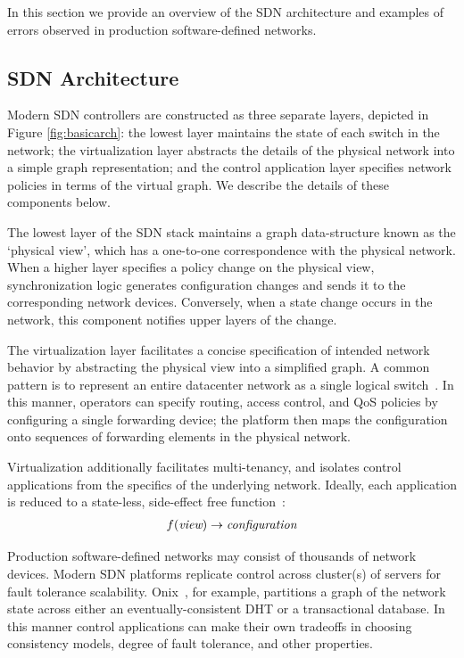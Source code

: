 In this section we provide an overview of the SDN architecture and examples 
of errors observed in production software-defined networks.

\subsection{SDN Architecture}

Modern SDN controllers are constructed as three separate layers, depicted in Figure \ref{fig:basicarch}:
the lowest layer maintains the state of each switch in the network; the virtualization layer 
abstracts the details of the physical network into a simple graph representation;
and the control application layer specifies network policies in terms of the
virtual graph. We describe the details of these components below.

The lowest layer of the SDN stack maintains a graph data-structure known as
the `physical view', which has a one-to-one correspondence with the physical
network. When a higher layer specifies a policy change on the physical view,
synchronization logic generates configuration changes and sends it to the
corresponding network devices. Conversely, when a state change
occurs in the network, this component notifies upper layers of the change.

The virtualization layer facilitates a concise specification of
intended network behavior by abstracting the physical view into a simplified
graph. A common pattern is to represent an entire
datacenter network as a single logical
switch~\cite{Casado:2010:VNF:1921151.1921162}. In this manner, operators
can specify routing, access control, and QoS policies by configuring a single forwarding
device; the platform then maps the configuration onto sequences 
of forwarding elements in the physical network.

Virtualization additionally facilitates multi-tenancy, and isolates control applications from the specifics
of the underlying network. Ideally, each application is reduced to a
state-less, side-effect free function~\cite{keynote}:
\begin{align*}
f(\text{\it view}) \rightarrow \text{\it configuration}
\end{align*}

Production software-defined networks may consist of thousands of network
devices. Modern SDN platforms replicate control across cluster(s) of servers
for fault tolerance scalability.
Onix~\cite{onix}, for example,
partitions a graph of the network state across either an eventually-consistent
DHT or a transactional database. In this manner control applications can make their own
tradeoffs in choosing consistency models, degree of
fault tolerance, and other properties.

